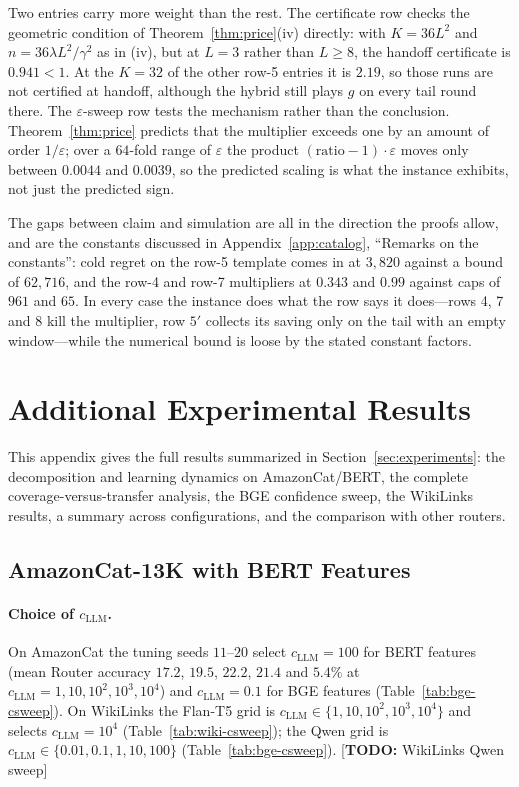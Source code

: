 \documentclass{article}
\theoremstyle{definition}
\theoremstyle{remark}
\newcommand{\eps}{\varepsilon}
\theoremstyle{remark}
\newcommand{\todo}[1]{\textcolor{red!70!black}{[\textbf{TODO:} #1]}}
\begin{document}
Two entries carry more weight than the rest. The certificate row checks the
geometric condition of Theorem~\ref{thm:price}(iv) directly: with $K=36L^2$
and $n=36\lambda L^2/\gamma^2$ as in (iv), but at $L=3$ rather than $L\ge8$, the
handoff certificate is $0.941<1$. At the $K=32$ of the other row-5 entries it
is $2.19$, so those runs are not certified at handoff, although the hybrid
still plays $g$ on every tail round there. The $\eps$-sweep row tests the
mechanism rather than the conclusion. Theorem~\ref{thm:price} predicts that
the multiplier exceeds one by an amount of order $1/\eps$; over a $64$-fold
range of $\eps$ the product $(\text{ratio}-1)\cdot\eps$ moves only between
$0.0044$ and $0.0039$, so the predicted scaling is what the instance exhibits,
not just the predicted sign.

The gaps between claim and simulation are all in the direction the proofs
allow, and are the constants discussed in
Appendix~\ref{app:catalog}, ``Remarks on the constants'': cold regret on the
row-5 template comes in at $3{,}820$ against a bound of $62{,}716$, and the
row-4 and row-7 multipliers at $0.343$ and $0.99$ against caps of $961$ and
$65$. In every case the instance does what the row says it does---rows 4, 7
and 8 kill the multiplier, row $5'$ collects its saving only on the tail with
an empty window---while the numerical bound is loose by the stated constant
factors.

\section{Additional Experimental Results}
\label{app:more-exp}

This appendix gives the full results summarized in Section~\ref{sec:experiments}:
the decomposition and learning dynamics on AmazonCat/BERT, the complete
coverage-versus-transfer analysis, the BGE confidence sweep, the WikiLinks
results, a summary across configurations, and the comparison with other
routers.

\subsection{AmazonCat-13K with BERT Features}
\label{app:amazon-bert}

\paragraph{Choice of $c_{\mathrm{LLM}}$.} On AmazonCat the tuning seeds $11$--$20$ select
$c_{\mathrm{LLM}}=100$ for BERT features (mean Router accuracy $17.2$, $19.5$, $22.2$, $21.4$
and $5.4\%$ at $c_{\mathrm{LLM}}=1,10,10^2,10^3,10^4$) and $c_{\mathrm{LLM}}=0.1$ for BGE features
(Table~\ref{tab:bge-csweep}). On WikiLinks the Flan-T5 grid is
$c_{\mathrm{LLM}}\in\{1,10,10^2,10^3,10^4\}$ and selects $c_{\mathrm{LLM}}=10^4$
(Table~\ref{tab:wiki-csweep}); the Qwen grid is
$c_{\mathrm{LLM}}\in\{0.01,0.1,1,10,100\}$ (Table~\ref{tab:bge-csweep}).
\todo{WikiLinks Qwen sweep}
\end{document}
